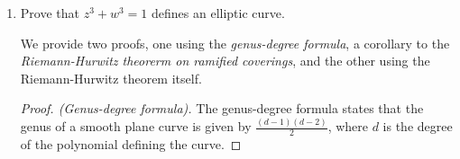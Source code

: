 \documentclass{article}
\begin{document}
\begin{enumerate}
\begin{proof}
		Since $f,g$ are holomorphic on $\partial D$, they are continuous, and since $\partial D$ is a closed subset of $\mathbb{C}$, it is compact.
		The modulus function is also continuous, and so by composition,		
		$|f|,|g|$ are both continuous real-valued functions and thus achieve a maximum and minimum on $\partial D$.
		
		Let $m = \min_{z \in \partial D} f$ and $M = \max_{z \in \partial D} g$. Pick $\epsilon < \frac{m}{M}$. Then on $\partial D$ 
		\begin{align*}
			| \epsilon g | &= \epsilon |g|\\
			& < \frac{m}{M} |g|\\
			& \leq \frac{m}{M}M\\
			&= m \leq |f|.
		\end{align*}
	\end{proof}
	
	\item Prove that $z^3+w^3 = 1$ defines an elliptic curve.
	
	We provide two proofs, one using the \emph{genus-degree formula}, a corollary to the \emph{Riemann-Hurwitz theorerm on ramified coverings},
	and the other using the Riemann-Hurwitz theorem itself.
	
	\begin{proof}[Proof. (Genus-degree formula)]
	
	The genus-degree formula states that the genus of a smooth plane curve is given by $\frac{(d-1)(d-2)}{2}$, 
	where $d$ is the degree of the polynomial defining the curve.
	

\end{proof}
\end{enumerate}
\end{document}
